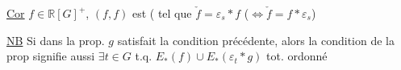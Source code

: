 \uline{Cor} $f\in\mathbb R[G]^+$,  $(f,f)$ est  (  tel que $\check f=\varepsilon_s\ast f$ ($\Longleftrightarrow\check f=f\ast\varepsilon_s$)

\uline{NB} Si dans la prop. $g$ satisfait la condition précédente, alors la condition de la prop signifie aussi  $\exists t\in G$ t.q. $E_\ast(f)\cup E_\ast(\varepsilon_t\ast g)$ tot. ordonné
